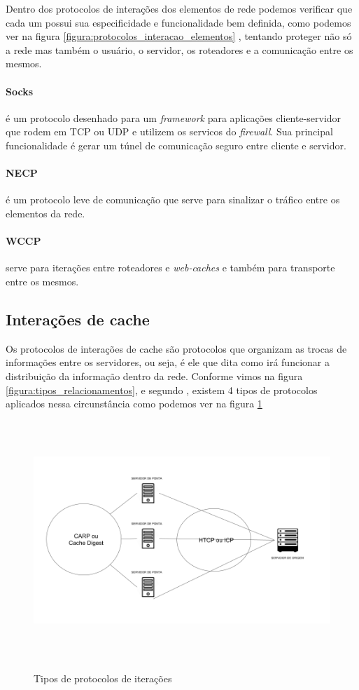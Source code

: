 Dentro dos protocolos de intera\c{c}\~oes dos elementos de rede podemos verificar que cada um possui sua especificidade e funcionalidade bem definida, como podemos ver na figura \ref{figura:protocolos_interacao_elementos} , tentando proteger n\~ao s\'o a rede mas tamb\'em o usu\'ario, o servidor, os roteadores e a comunica\c{c}\~ao entre os mesmos.
\paragraph{Socks} \'e um protocolo desenhado para um \textit{framework} para aplica\c{c}\~oes cliente-servidor que rodem em TCP ou UDP e utilizem os servi{c}os do \textit{firewall}. Sua principal funcionalidade \'e gerar um t\'unel de comunica\c{c}\~ao seguro entre cliente e servidor.
\paragraph{NECP} \'e um protocolo leve de comunica\c{c}\~ao que serve para sinalizar o tr\'afico entre os elementos da rede.
\paragraph{WCCP} serve para itera\c{c}\~oes entre roteadores e \textit{web-caches}	e tamb\'em para transporte entre os mesmos.


\subsection{Intera\c{c}\~oes de cache}

Os protocolos de intera\c{c}\~oes de cache s\~ao protocolos que organizam as trocas de informa\c{c}\~oes entre os servidores, ou seja, \'e ele que dita como ir\'a funcionar a distribui\c{c}\~ao da informa\c{c}\~ao dentro da rede.
 Conforme vimos na figura \ref{figura:tipos_relacionamentos}, e segundo \cite{pathan2007taxonomy}, existem 4 tipos de protocolos aplicados nessa circunst\^ancia como podemos ver na figura \ref{figura:protocolos_interacao_cache}
\begin{figure}[H]
\caption{Tipos de protocolos de itera\c{c}\~oes}
\includegraphics[height=9cm]{Figuras/protocolos_interacoes_cache.png} 
\label{figura:protocolos_interacao_cache}
\end{figure}


